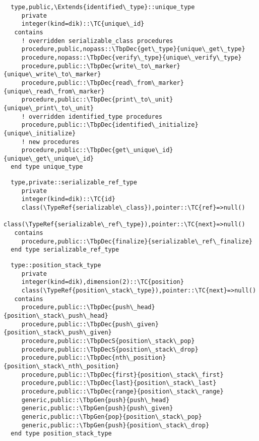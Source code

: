 \begin{Verbatim}
  type,public,\Extends{identified\_type}::unique_type
     private
     integer(kind=dik)::\TC{unique\_id}
   contains
     ! overridden serializable_class procedures
     procedure,public,nopass::\TbpDec{get\_type}{unique\_get\_type}
     procedure,nopass::\TbpDec{verify\_type}{unique\_verify\_type}
     procedure,public::\TbpDec{write\_to\_marker}{unique\_write\_to\_marker}
     procedure,public::\TbpDec{read\_from\_marker}{unique\_read\_from\_marker}
     procedure,public::\TbpDec{print\_to\_unit}{unique\_print\_to\_unit}
     ! overridden identified_type procedures
     procedure,public::\TbpDec{identified\_initialize}{unique\_initialize}
     ! new procedures
     procedure,public::\TbpDec{get\_unique\_id}{unique\_get\_unique\_id}
  end type unique_type
\end{Verbatim}
\begin{Verbatim}
  type,private::serializable_ref_type
     private
     integer(kind=dik)::\TC{id}
     class(\TypeRef{serializable\_class}),pointer::\TC{ref}=>null()
     class(\TypeRef{serializable\_ref\_type}),pointer::\TC{next}=>null()
   contains
     procedure,public::\TbpDec{finalize}{serializable\_ref\_finalize}
  end type serializable_ref_type
\end{Verbatim}
\begin{Verbatim}
  type::position_stack_type
     private
     integer(kind=dik),dimension(2)::\TC{position}
     class(\TypeRef{position\_stack\_type}),pointer::\TC{next}=>null()
   contains
     procedure,public::\TbpDec{push\_head}{position\_stack\_push\_head}
     procedure,public::\TbpDec{push\_given}{position\_stack\_push\_given}
     procedure,public::\TbpDecS{position\_stack\_pop}
     procedure,public::\TbpDecS{position\_stack\_drop}
     procedure,public::\TbpDec{nth\_position}{position\_stack\_nth\_position}
     procedure,public::\TbpDec{first}{position\_stack\_first}
     procedure,public::\TbpDec{last}{position\_stack\_last}
     procedure,public::\TbpDec{range}{position\_stack\_range}
     generic,public::\TbpGen{push}{push\_head}
     generic,public::\TbpGen{push}{push\_given}
     generic,public::\TbpGen{pop}{position\_stack\_pop}
     generic,public::\TbpGen{push}{position\_stack\_drop}
  end type position_stack_type
\end{Verbatim}
